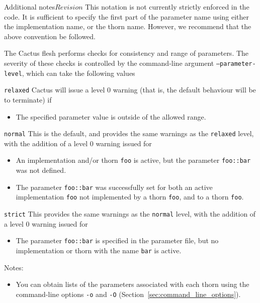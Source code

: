 \begin{cactuspart}{Additional notes}{}{$Revision$}
This notation is not currently strictly enforced in the code. It is
sufficient to specify the first part of the parameter name using either
the implementation name, or the thorn name. However, we recommend
that the above convention be followed.

The Cactus flesh performs checks for consistency and range of parameters.
The severity of these checks is controlled by the command-line argument
\texttt{--parameter-level}, which can take the following values
\begin{Lentry}
\item[\texttt{relaxed}] Cactus will issue a level 0 warning (that is, the
default behaviour will be to terminate) if
\begin{itemize}
\item{} The specified parameter value is outside of the allowed range.
\end{itemize}

\item [\texttt{normal}]
This is the default, and provides the same warnings as the
\texttt{relaxed} level, with the addition of a level 0 warning issued for
\begin{itemize}
\item{} An implementation and/or thorn \texttt{foo} is active, but the
        parameter \texttt{foo::bar} was not defined.
\item{} The parameter \texttt{foo::bar} was successfully set for both an
        active implementation \texttt{foo} not implemented by a thorn \texttt{foo},
        and to a thorn \texttt{foo}.
\end{itemize}

\item [\texttt{strict}]
This provides the same warnings as the \texttt{normal} level, with the
addition of a level 0 warning issued for
\begin{itemize}
\item{} The parameter \texttt{foo::bar} is specified in the parameter file,
        but no implementation or thorn with the name \texttt{bar} is active.
\end{itemize}
\end{Lentry}

Notes:

\begin{itemize}

\item{} You can obtain lists of the parameters associated with
each thorn using the command-line options \texttt{-o} and \texttt{-O}
(Section~\ref{sec:command_line_options}).


\end{itemize}
\end{cactuspart}
